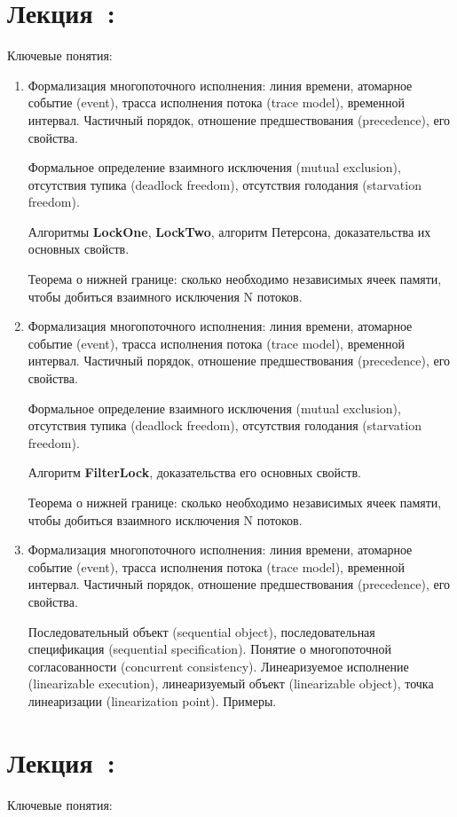 \documentclass[a4paper, 12pt]{extarticle}
\newcommand{\foundationBasics}{Формализация многопоточного исполнения: линия времени, атомарное событие (event), трасса исполнения потока (trace model), временной интервал. Частичный порядок, отношение предшествования (precedence), его свойства.}
\newcommand{\foundationMutex}{Формальное определение взаимного исключения (mutual exclusion), отсутствия тупика (deadlock freedom), отсутствия голодания (starvation freedom). }
\begin{document}
\section{Лекция~\foundationsNum: \foundationsTopic}

Ключевые понятия: \foundationsKey

\begin{enumerate}[\thesection .1]

	\item \foundationBasics

	\foundationMutex

	Алгоритмы \textbf{LockOne}, \textbf{LockTwo}, алгоритм Петерсона, доказательства их основных свойств.
	
	Теорема о нижней границе: сколько необходимо независимых ячеек памяти, чтобы добиться взаимного исключения N потоков.
	
	\item \foundationBasics

	\foundationMutex

	Алгоритм \textbf{FilterLock}, доказательства его основных свойств.

	Теорема о нижней границе: сколько необходимо независимых ячеек памяти, чтобы добиться взаимного исключения N потоков.

	\item \foundationBasics

	Последовательный объект (sequential object), последовательная спецификация (sequential specification).
	Понятие о многопоточной согласованности (concurrent consistency).
	Линеаризуемое исполнение (linearizable execution), линеаризуемый объект (linearizable object), точка линеаризации (linearization point). Примеры.

\end{enumerate}


\section{Лекция~\foundationsPlusNum: \foundationsPlusTopic}

Ключевые понятия: \foundationsPlusKey
\end{document}
